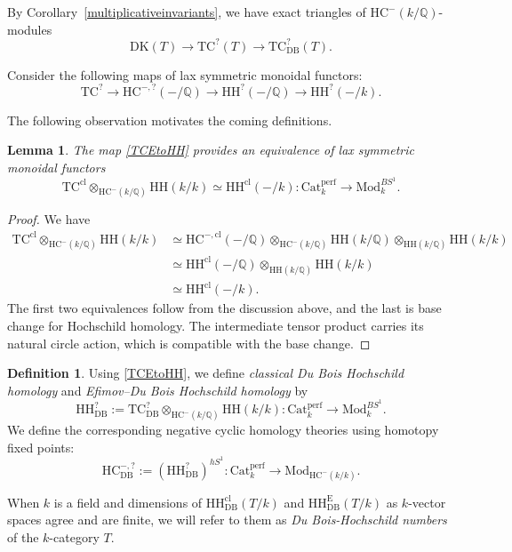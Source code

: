 \documentclass{amsart}
\theoremstyle{plain}
\newtheorem{lemma}[prop]{Lemma}
\theoremstyle{definition}
\newtheorem{defi}[prop]{Definition}
\newcommand{\bbQ}{\mathbb{Q}}
\newcommand{\Catperf}{\mathrm{Cat}^{\mathrm{perf}}}
\newcommand{\TC}{\mathrm{TC}}
\newcommand{\HH}{\mathrm{HH}}
\newcommand{\HC}{\mathrm{HC}}
\newcommand{\DK}{\mathrm{DK}}
\newcommand{\Mod}{\mathrm{Mod}}
\newcommand{\DB}{\mathrm{DB}}
\newcommand{\cl}{\mathrm{cl}}
\begin{document}
By Corollary~\ref{multiplicativeinvariants}, we have exact triangles of $\HC^-(k/\bbQ)$-modules
\begin{equation}\label{eqDKHCTCDBmodules}
\DK(T)\longrightarrow \TC^?(T)\longrightarrow \TC^?_{\DB}(T).
\end{equation}

Consider the following maps of lax symmetric monoidal functors:
\begin{equation}\label{TCEtoHH}
\TC^?\longrightarrow \HC^{-,?}(-/\bbQ)
\longrightarrow \HH^?(-/\bbQ)\longrightarrow \HH^?(-/k).
\end{equation}

The following observation motivates the coming definitions.

\begin{lemma}\label{equivariantscalarreduction}
The map \eqref{TCEtoHH} provides an equivalence of lax symmetric monoidal functors
\begin{equation}\label{eqequivariantscalarreduction}
\TC^{\cl}\otimes_{\HC^-(k/\bbQ)}\HH(k/k)
\simeq \HH^{\cl}(-/k):
\Catperf_k\longrightarrow\Mod_k^{BS^1}.
\end{equation}
\end{lemma}


\begin{proof}
We have
\begin{align*}
\TC^{\cl}\otimes_{\HC^-(k/\bbQ)}\HH(k/k)
&\simeq
\HC^{-, \cl}(-/\bbQ)\otimes_{\HC^-(k/\bbQ)}\HH(k/\bbQ)
                    \otimes_{\HH(k/\bbQ)}\HH(k/k)\\
&\simeq \HH^{\cl}(-/\bbQ)\otimes_{\HH(k/\bbQ)}\HH(k/k)\\
&\simeq \HH^{\cl}(-/k).
\end{align*}
The first two equivalences follow from the discussion above, and the last is base change for Hochschild homology. The intermediate tensor product carries its natural circle action, which is compatible with the base change.
\end{proof}


\begin{defi}\label{DBcyclicdefinitions}
Using \eqref{TCEtoHH}, we define \emph{classical Du Bois Hochschild homology} and \emph{Efimov--Du Bois Hochschild homology}
by
\[
\HH^?_{\DB}:=
\TC^?_{\DB}\otimes_{\HC^-(k/\bbQ)}\HH(k/k):
\Catperf_k\longrightarrow\Mod_k^{BS^1}.
\]
We define the corresponding negative cyclic homology theories using homotopy fixed points:
\[
\HC^{-,?}_{\DB}:=(\HH^?_{\DB})^{hS^1}:
\Catperf_k\longrightarrow\Mod_{\HC^-(k/k)}.
\]

When $k$ is a field and dimensions of $\HH^{\cl}_\DB(T/k)$ and $\HH^{\mathrm{E}}_\DB(T/k)$ as $k$-vector spaces agree and are finite, we will refer to them as \emph{Du Bois-Hochschild numbers} of the $k$-category $T$.
\end{defi}
\end{document}
